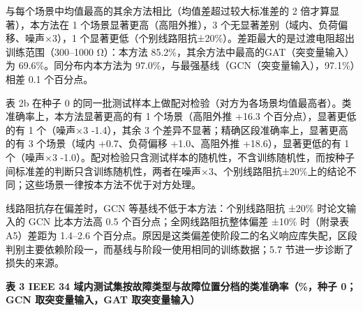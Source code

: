 \documentclass[
  11pt,
]{ctexart}
\begin{document}
与每个场景中均值最高的其余方法相比（均值差超过较大标准差的 2
倍才算显著），本方法在 1 个场景显著更高（高阻外推），3
个无显著差别（域内、负荷偏移、噪声×3），1
个显著更低（个别线路阻抗±20\%）。差距最大的是过渡电阻超出训练范围（300--1000
Ω）：本方法 85.2\%，其余方法中最高的GAT（突变量输入）为
69.6\%。同分布内本方法为
97.0\%，与最强基线（GCN（突变量输入），97.1\%）相差 0.1 个百分点。

表 2b 在种子 0
的同一批测试样本上做配对检验（对方为各场景均值最高者）。类准确率上，本方法显著更高的有
1 个场景（高阻外推 +16.3 个百分点），显著更低的有 1 个（噪声×3
-1.4），其余 3 个差异不显著；精确区段准确率上，显著更高的有 3
个场景（域内 +0.7、负荷偏移 +1.0、高阻外推 +18.6），显著更低的有 1
个（噪声×3
-1.0）。配对检验只含测试样本的随机性，不含训练随机性，而按种子间标准差的判断只含训练随机性，两者在噪声×3、个别线路阻抗±20\%上的结论不同；这些场景一律按本方法不优于对方处理。

线路阻抗存在偏差时，GCN 等基线不低于本方法：个别线路阻抗 ±20\%
时论文输入的 GCN 比本方法高 0.5 个百分点；全网线路阻抗整体偏差 ±10\%
时（附录表 A5）差距为 1.4--2.6
个百分点。原因是这类偏差使阶段二的名义响应库失配，区段判别主要依赖阶段一，而基线与阶段一使用相同的训练数据；5.7
节进一步诊断了损失的来源。

\textbf{表 3 IEEE 34
域内测试集按故障类型与故障位置分档的类准确率（\%，种子 0；GCN
取突变量输入，GAT 取突变量输入）}
\end{document}
